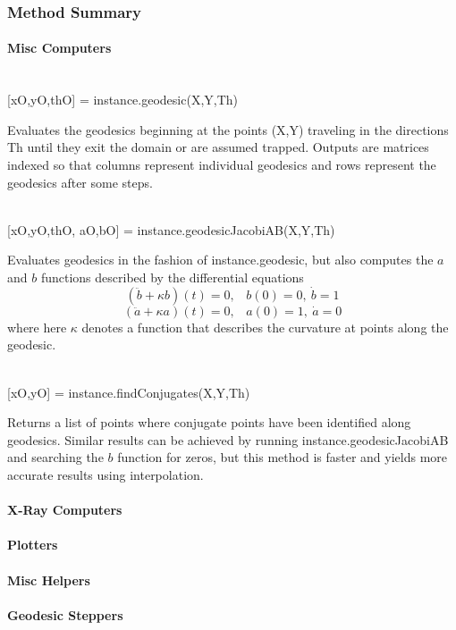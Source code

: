 \documentclass[10pt]{article}
\newcommand{\methodbr}{\hfill\vspace{5pt}\\}
\newenvironment{codetext} { 
\fontfamily{qcr}\selectfont 
}%
{  }
\newenvironment{methodInfo}[1]{%
  \methodbr \footnotesize  \begin{codetext} #1 \end{codetext} \vspace*{-5pt}
  \begin{center}\begin{minipage}[t]{0.9\textwidth}
}
{\end{minipage}\end{center} \vspace*{-15pt}}
\begin{document}
		\subsubsection{Method Summary}
			\paragraph{Misc Computers}
				\begin{methodInfo}{[xO,yO,thO] = instance.geodesic(X,Y,Th)}
					Evaluates the geodesics beginning at the points (X,Y) traveling in the directions Th until they exit the domain or are assumed trapped.
					Outputs are matrices indexed so that columns represent individual geodesics and rows represent the geodesics after some steps.
				\end{methodInfo}
				\begin{methodInfo}{[xO,yO,thO, aO,bO] = instance.geodesicJacobiAB(X,Y,Th)}
					Evaluates geodesics in the fashion of instance.geodesic, but also computes the $a$ and $b$ functions described by the differential equations
					\[(\ddot{b}+\kappa b)(t) = 0, \hspace{10pt} b(0) = 0, \ \dot{b} = 1\] 
					\vspace*{-21pt}\[(\ddot{a}+\kappa a)(t) = 0, \hspace{10pt} a(0) = 1, \ \dot{a} = 0\]
					where here $\kappa$ denotes a function that describes the curvature at points along the geodesic.
				\end{methodInfo}
				\begin{methodInfo}{[xO,yO] = instance.findConjugates(X,Y,Th)}
					Returns a list of points where conjugate points have been identified along geodesics. 
					Similar results can be achieved by running instance.geodesicJacobiAB and searching the $b$ function for zeros, but this method is faster and yields more accurate results using interpolation.
				\end{methodInfo}
			\paragraph{X-Ray Computers}
			\paragraph{Plotters}
			\paragraph{Misc Helpers}
			\paragraph{Geodesic Steppers}
\end{document}

